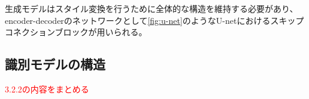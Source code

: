 
生成モデルはスタイル変換を行うために全体的な構造を維持する必要があり、encoder-decoderのネットワークとして\ref{fig:u-net}のようなU-net\cite{u-net}におけるスキップコネクションブロックが用いられる。

\subsection{識別モデルの構造}

\textcolor{red}{3.2.2の内容をまとめる}


